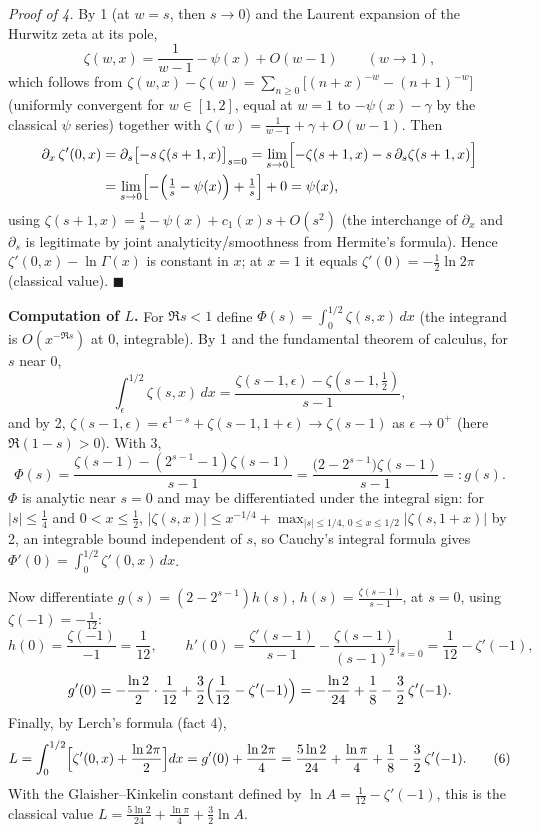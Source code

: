 \documentclass[11pt]{article}
\theoremstyle{remark}
\begin{document}
\emph{Proof of 4.} By 1 (at $w=s$, then $s\to0$) and the Laurent expansion of the Hurwitz zeta at its pole,
$$
\zeta(w,x)=\frac{1}{w-1}-\psi(x)+O(w-1)\qquad(w\to1),
$$
which follows from $\zeta(w,x)-\zeta(w)=\sum_{n\ge0}\bigl[(n+x)^{-w}-(n+1)^{-w}\bigr]$ (uniformly convergent for $w\in[1,2]$, equal at $w=1$ to $-\psi(x)-\gamma$ by the classical $\psi$ series) together with $\zeta(w)=\frac1{w-1}+\gamma+O(w-1)$. Then
\begin{equation*}
\begin{aligned}
\partial_x\,\zeta'(0,x)&=\partial_s\bigl[-s\,\zeta(s+1,x)\bigr]_{s=0}
=\lim_{s\to0}\Bigl[-\zeta(s+1,x)-s\,\partial_s\zeta(s+1,x)\Bigr]\\
&=\lim_{s\to0}\Bigl[-\Bigl(\tfrac1s-\psi(x)\Bigr)+\tfrac1s\Bigr]+0=\psi(x),
\end{aligned}
\end{equation*}
using $\zeta(s+1,x)=\frac1s-\psi(x)+c_1(x)s+O(s^2)$ (the interchange of $\partial_x$ and $\partial_s$ is legitimate by joint analyticity/smoothness from Hermite's formula). Hence $\zeta'(0,x)-\ln\Gamma(x)$ is constant in $x$; at $x=1$ it equals $\zeta'(0)=-\frac12\ln2\pi$ (classical value). $\blacksquare$

\textbf{Computation of $L$.} For $\Re s<1$ define $\Phi(s)=\int_0^{1/2}\zeta(s,x)\,dx$ (the integrand is $O(x^{-\Re s})$ at $0$, integrable). By 1 and the fundamental theorem of calculus, for $s$ near $0$,
$$
\int_\epsilon^{1/2}\zeta(s,x)\,dx=\frac{\zeta(s-1,\epsilon)-\zeta(s-1,\tfrac12)}{s-1},
$$
and by 2, $\zeta(s-1,\epsilon)=\epsilon^{1-s}+\zeta(s-1,1+\epsilon)\to\zeta(s-1)$ as $\epsilon\to0^{+}$ (here $\Re(1-s)>0$). With 3,
$$
\Phi(s)=\frac{\zeta(s-1)-(2^{s-1}-1)\zeta(s-1)}{s-1}=\frac{\bigl(2-2^{s-1}\bigr)\zeta(s-1)}{s-1}=:g(s).
$$
$\Phi$ is analytic near $s=0$ and may be differentiated under the integral sign: for $|s|\le\frac14$ and $0<x\le\frac12$, $|\zeta(s,x)|\le x^{-1/4}+\max_{|s|\le 1/4,\,0\le x\le 1/2}|\zeta(s,1+x)|$ by 2, an integrable bound independent of $s$, so Cauchy's integral formula gives $\Phi'(0)=\int_0^{1/2}\zeta'(0,x)\,dx$.

Now differentiate $g(s)=(2-2^{s-1})h(s)$, $h(s)=\frac{\zeta(s-1)}{s-1}$, at $s=0$, using $\zeta(-1)=-\frac1{12}$:
$$
h(0)=\frac{\zeta(-1)}{-1}=\frac1{12},\qquad
h'(0)=\frac{\zeta'(s-1)}{s-1}-\frac{\zeta(s-1)}{(s-1)^{2}}\Big|_{s=0}=\frac1{12}-\zeta'(-1),
$$
$$
g'(0)=-\frac{\ln 2}{2}\cdot\frac{1}{12}+\frac32\Bigl(\frac1{12}-\zeta'(-1)\Bigr)
=-\frac{\ln 2}{24}+\frac18-\frac32\,\zeta'(-1).
$$
Finally, by Lerch's formula (fact 4),
\begin{equation*}
L=\int_0^{1/2}\Bigl[\zeta'(0,x)+\frac{\ln 2\pi}{2}\Bigr]dx
=g'(0)+\frac{\ln 2\pi}{4}
=\frac{5\ln 2}{24}+\frac{\ln\pi}{4}+\frac18-\frac32\,\zeta'(-1).
\tag{6}
\end{equation*}
With the Glaisher--Kinkelin constant defined by $\ln A=\frac1{12}-\zeta'(-1)$, this is the classical value
$L=\frac{5\ln2}{24}+\frac{\ln\pi}{4}+\frac32\ln A$.
\end{document}
